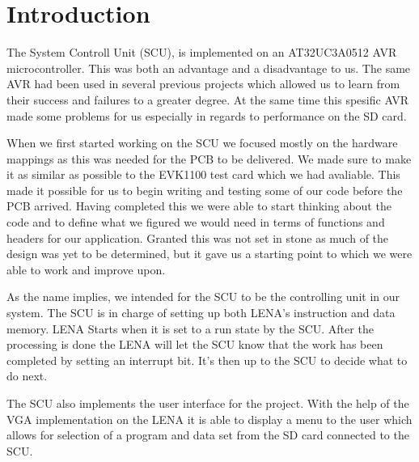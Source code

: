 \section{Introduction}

The System Controll Unit (SCU), is implemented on an AT32UC3A0512 AVR microcontroller. This was both an advantage and a disadvantage to us. The same AVR had been used in several previous projects which allowed us to learn from their success and failures to a greater degree. At the same time this spesific AVR made some problems for us especially in regards to performance on the SD card. 

When we first started working on the SCU we focused mostly on the hardware mappings as this was needed for the PCB to be delivered. We made sure to make it as similar as possible to the EVK1100 test card which we had avaliable. This made it possible for us to begin writing and testing some of our code before the PCB arrived. Having completed this we were able to start thinking about the code and to define what we figured we would need in terms of functions and headers for our application. Granted this was not set in stone as much of the design was yet to be determined, but it gave us a starting point to which we were able to work and improve upon.

As the name implies, we intended for the SCU to be the controlling unit in our system. The SCU is in charge of setting up both LENA's instruction and data memory. LENA Starts when it is set to a run state by the SCU. After the processing is done the LENA will let the SCU know that the work has been completed by setting an interrupt bit. It's then up to the SCU to decide what to do next. 

The SCU also implements the user interface for the project. With the help of the VGA implementation on the LENA it is able to display a menu to the user which allows for selection of a program and data set from the SD card connected to the SCU.
